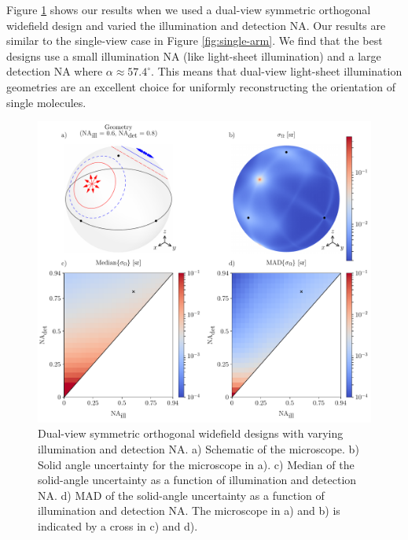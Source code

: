 \documentclass[10pt]{article}
\begin{document}
Figure \ref{fig:double-arm} shows our results when we used a dual-view symmetric
orthogonal widefield design and varied the illumination and detection NA. Our
results are similar to the single-view case in Figure \ref{fig:single-arm}. We
find that the best designs use a small illumination NA (like light-sheet
illumination) and a large detection NA where $\alpha \approx 57.4^{\circ}$. This
means that dual-view light-sheet illumination geometries are an excellent choice
for uniformly reconstructing the orientation of single molecules.

\begin{figure}[htbp]
\centering\includegraphics[width=\textwidth]{double-arm}
\caption{Dual-view symmetric orthogonal widefield designs with varying
  illumination and detection NA. a) Schematic of the microscope. b) Solid angle
  uncertainty for the microscope in a). c) Median of the solid-angle uncertainty
  as a function of illumination and detection NA. d) MAD of the solid-angle
  uncertainty as a function of illumination and detection NA. The microscope in
  a) and b) is indicated by a cross in c) and d).}
\label{fig:double-arm}
\end{figure}
\end{document}
